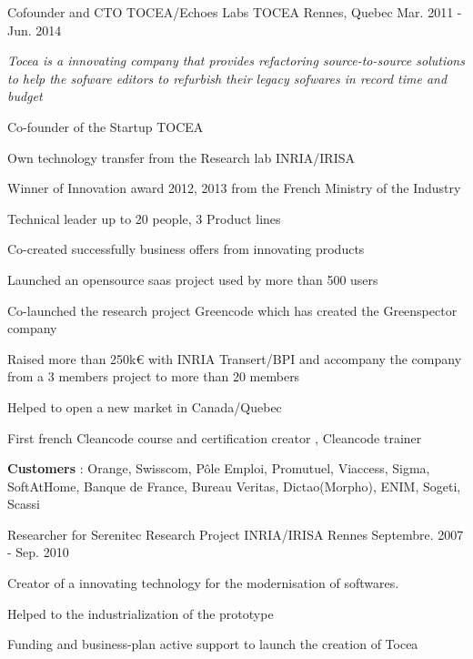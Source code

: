 \begin{cventries}
  \cventry
    {Cofounder and CTO TOCEA/Echoes Labs} %
    {TOCEA} %
    {Rennes, Quebec} %
    {Mar. 2011 - Jun. 2014} %
    {
      \begin{cvitems} %
      	 \item {\textit{Tocea is a innovating company that provides refactoring source-to-source solutions to help the sofware editors to refurbish their legacy sofwares in record time and budget}}
        \item {Co-founder of the Startup TOCEA}        
        \item {Own technology transfer from the Research lab INRIA/IRISA}
        \item {Winner of Innovation award 2012, 2013 from the French Ministry of the Industry}                
        \item {Technical leader up to 20 people, 3 Product lines}        
        \item {Co-created successfully business offers from innovating products}
        \item {Launched an opensource saas project used by more than 500 users}
        \item {Co-launched the research project Greencode which has created the Greenspector company}
        \item {Raised more than 250k€ with INRIA Transert/BPI and accompany the company from a 3 members project to more than 20 members}                
        \item {Helped to open a new market in Canada/Quebec}
		\item {First french Cleancode course and certification creator , Cleancode trainer}
        \item {\textbf{Customers} : Orange, Swisscom, Pôle Emploi, Promutuel, Viaccess, Sigma, SoftAtHome, Banque de France, Bureau Veritas, Dictao(Morpho), ENIM, Sogeti, Scassi}
      \end{cvitems}
    }

  \cventry
    {Researcher for Serenitec Research Project} %
    {INRIA/IRISA} %
    {Rennes} %
    {Septembre. 2007 - Sep. 2010} %
    {
      \begin{cvitems} %
        \item {Creator of a innovating technology for the modernisation of softwares.}
        \item {Helped to the industrialization of the prototype }
        \item {Funding and business-plan active support to launch the creation of Tocea}        
      \end{cvitems} 
    }


\end{cventries}

